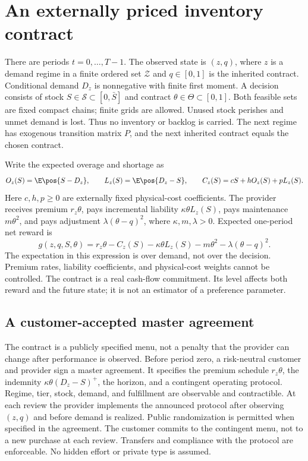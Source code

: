 \section{An externally priced inventory contract}\label{sec:model}
There are periods $t=0,\ldots,T-1$. The observed state is $(z,q)$, where $z$ is a demand regime in a finite ordered set $\mathcal Z$ and $q\in[0,1]$ is the inherited contract. Conditional demand $D_z$ is nonnegative with finite first moment. A decision consists of stock $S\in\mathcal S\subset[0,\bar S]$ and contract $\theta\in\Theta\subset[0,1]$. Both feasible sets are fixed compact chains; finite grids are allowed. Unused stock perishes and unmet demand is lost. Thus no inventory or backlog is carried. The next regime has exogenous transition matrix $P$, and the next inherited contract equals the chosen contract.

Write the expected overage and shortage as
\begin{equation}\label{eq:cost}
 O_z(S)=\E\pos{S-D_z},\qquad L_z(S)=\E\pos{D_z-S},\qquad
 C_z(S)=cS+hO_z(S)+pL_z(S).
\end{equation}
Here $c,h,p\geq0$ are externally fixed physical-cost coefficients. The provider receives premium $r_z\theta$, pays incremental liability $\kappa\theta L_z(S)$, pays maintenance $m\theta^2$, and pays adjustment $\lambda(\theta-q)^2$, where $\kappa,m,\lambda>0$. Expected one-period net reward is
\begin{equation}\label{eq:reward}
 g(z,q,S,\theta)=r_z\theta-C_z(S)-\kappa\theta L_z(S)
                       -m\theta^2-\lambda(\theta-q)^2.
\end{equation}
The expectation in this expression is over demand, not over the decision. Premium rates, liability coefficients, and physical-cost weights cannot be controlled. The contract is a real cash-flow commitment. Its level affects both reward and the future state; it is not an estimator of a preference parameter.

\subsection{A customer-accepted master agreement}\label{sec:institution}
The contract is a publicly specified menu, not a penalty that the provider can change after performance is observed. Before period zero, a risk-neutral customer and provider sign a master agreement. It specifies the premium schedule $r_z\theta$, the indemnity $\kappa\theta(D_z-S)^+$, the horizon, and a contingent operating protocol. Regime, tier, stock, demand, and fulfillment are observable and contractible. At each review the provider implements the announced protocol after observing $(z,q)$ and before demand is realized. Public randomization is permitted when specified in the agreement. The customer commits to the contingent menu, not to a new purchase at each review. Transfers and compliance with the protocol are enforceable. No hidden effort or private type is assumed.

